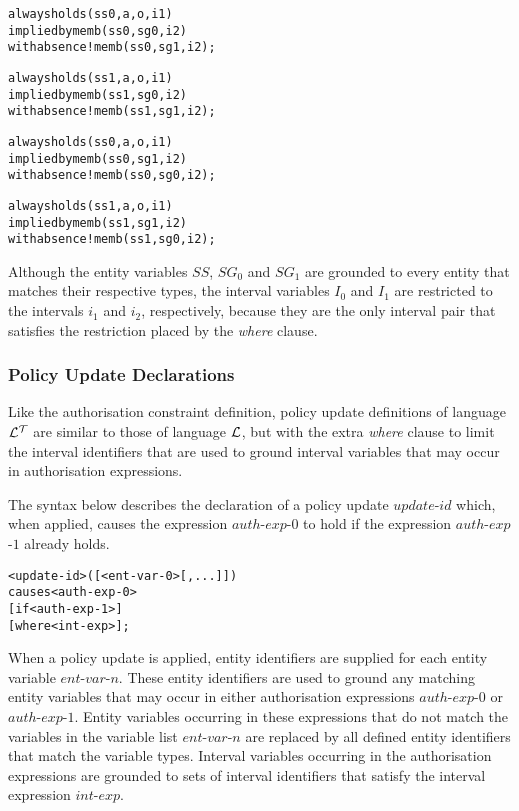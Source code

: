\documentclass[11pt]{report}
\newenvironment{vverbatim}
{
  \begin{alltt}
}
{
  \vspace{-\baselineskip}
  \end{alltt}
}
\begin{document}
          \begin{vverbatim}
  always holds(ss0, a, o, i1)
    implied by memb(ss0, sg0, i2)
    with absence !memb(ss0, sg1, i2);

  always holds(ss1, a, o, i1)
    implied by memb(ss1, sg0, i2)
    with absence !memb(ss1, sg1, i2);

  always holds(ss0, a, o, i1)
    implied by memb(ss0, sg1, i2)
    with absence !memb(ss0, sg0, i2);

  always holds(ss1, a, o, i1)
    implied by memb(ss1, sg1, i2)
    with absence !memb(ss1, sg0, i2);
          \end{vverbatim}

          Although the entity variables $SS$, $SG_0$ and $SG_1$ are grounded
          to every entity that matches their respective types, the interval
          variables $I_0$ and $I_1$ are restricted to the intervals $i_1$ and
          $i_2$, respectively, because they are the only interval pair that
          satisfies the restriction placed by the {\em where} clause.

        \subsubsection{Policy Update Declarations}

          Like the authorisation constraint definition, policy update
          definitions of language ${\cal L^T}$ are similar to those of language
          ${\cal L}$, but with the extra {\em where} clause to limit the
          interval identifiers that are used to ground interval variables that
          may occur in authorisation expressions.

          The syntax below describes the declaration of a policy update
          $update$-$id$ which, when applied, causes the expression
          $auth$-$exp$-$0$ to hold if the expression $auth$-$exp$-$1$ already
          holds.

          \begin{vverbatim}
  <update-id>([<ent-var-0>[, ...]])
    causes <auth-exp-0>
    [if <auth-exp-1>]
    [where <int-exp>];
          \end{vverbatim}

          When a policy update is applied, entity identifiers are supplied for
          each entity variable $ent$-$var$-$n$. These entity identifiers are
          used to ground any matching entity variables that may occur in either
          authorisation expressions $auth$-$exp$-$0$ or $auth$-$exp$-$1$.
          Entity variables occurring in these expressions that do not match
          the variables in the variable list $ent$-$var$-$n$ are replaced by
          all defined entity identifiers that match the variable types.
          Interval variables occurring in the authorisation expressions are
          grounded to sets of interval identifiers that satisfy the interval
          expression $int$-$exp$.
\end{document}
